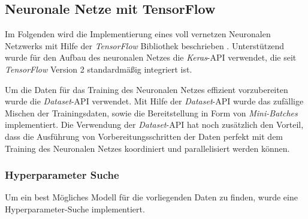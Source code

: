 \subsection{Neuronale Netze mit TensorFlow}
Im Folgenden wird die Implementierung eines voll vernetzen Neuronalen Netzwerks mit Hilfe der \emph{TensorFlow} Bibliothek beschrieben \cite{tensorflow2015-whitepaper}. Unterstützend wurde für den Aufbau des neuronalen Netzes die \emph{Keras}-API verwendet, die seit \emph{TensorFlow} Version 2 standardmäßig integriert ist. 

Um die Daten für das Training des Neuronalen Netzes effizient vorzubereiten wurde die \emph{Dataset}-API verwendet. Mit Hilfe der \emph{Dataset}-API wurde das zufällige Mischen der Trainingsdaten, sowie die Bereitstellung in Form von \emph{Mini-Batches} implementiert. Die Verwendung der \emph{Dataset}-API hat noch zusätzlich den Vorteil, dass die Ausführung von Vorbereitungsschritten der Daten perfekt mit dem Training des Neuronalen Netzes koordiniert und parallelisiert werden können.

\subsubsection{Hyperparameter Suche}
Um ein best Mögliches Modell für die vorliegenden Daten zu finden, wurde eine Hyperparameter-Suche implementiert.
